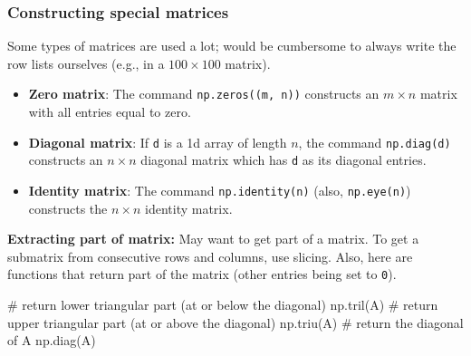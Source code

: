 \documentclass{beamer}
\newenvironment{codeblock}
    {\hfill\begin{beamerboxesrounded}[lower=codecol, width=0.8\textwidth]
    \medskip

    }
    { 
    \end{beamerboxesrounded}\hfill
    }
\theoremstyle{example}
\newcommand{\ttt}[1]{{\small\texttt{#1}}}
\begin{document}
\begin{frame}[fragile]
\frametitle{Constructing special matrices}
Some types of matrices are used a lot; would be cumbersome to always write the row lists ourselves (e.g., in a $100\times100$ matrix).
    
    \begin{itemize}
        \item[] \textbf{Zero matrix}: The command \ttt{np.zeros((m, n))} constructs an $m\times n$ matrix with all entries equal to zero.
        \pause
        \item[] \textbf{Diagonal matrix}: If \ttt{d} is a 1d array of length $n$, the command \ttt{np.diag(d)} constructs an $n\times n$ diagonal matrix which has \ttt{d} as its diagonal entries.
        \pause
        \item[] \textbf{Identity matrix}: The command \ttt{np.identity(n)} (also, \ttt{np.eye(n)}) constructs the $n\times n$ identity matrix.
    \end{itemize}
    
\textbf{Extracting part of matrix:} May want to get part of a matrix. To get a submatrix from consecutive rows and columns, use slicing. \pause
Also, here are functions that return part of the matrix (other entries being set to \ttt{0}).%

\begin{codeblock}

\begin{python}
# return lower triangular part (at or below the diagonal)
np.tril(A)
# return upper triangular part (at or above the diagonal)
np.triu(A)
# return the diagonal of A
np.diag(A)
\end{python}

\end{codeblock}
\end{frame}
\end{document}
